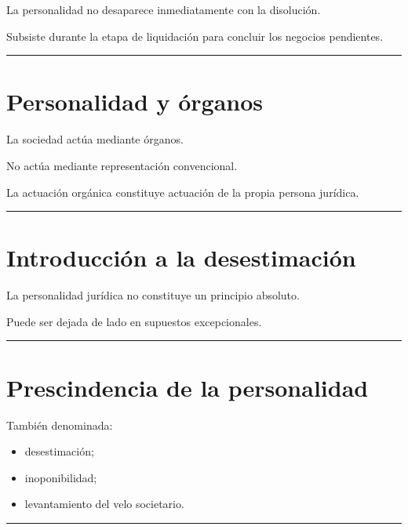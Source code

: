 \documentclass[
  spanish,
  letterpaper,
  DIV=11,
  numbers=noendperiod]{scrartcl}
\providecommand{\tightlist}{%
  \setlength{\itemsep}{0pt}\setlength{\parskip}{0pt}}
\begin{document}
La personalidad no desaparece inmediatamente con la disolución.

Subsiste durante la etapa de liquidación para concluir los negocios
pendientes.

\begin{center}\rule{0.5\linewidth}{0.5pt}\end{center}

\section{Personalidad y órganos}\label{personalidad-y-uxf3rganos}

La sociedad actúa mediante órganos.

No actúa mediante representación convencional.

La actuación orgánica constituye actuación de la propia persona
jurídica.

\begin{center}\rule{0.5\linewidth}{0.5pt}\end{center}

\section{Introducción a la
desestimación}\label{introducciuxf3n-a-la-desestimaciuxf3n}

La personalidad jurídica no constituye un principio absoluto.

Puede ser dejada de lado en supuestos excepcionales.

\begin{center}\rule{0.5\linewidth}{0.5pt}\end{center}

\section{Prescindencia de la
personalidad}\label{prescindencia-de-la-personalidad}

También denominada:

\begin{itemize}
\tightlist
\item
  desestimación;
\item
  inoponibilidad;
\item
  levantamiento del velo societario.
\end{itemize}

\begin{center}\rule{0.5\linewidth}{0.5pt}\end{center}
\end{document}
